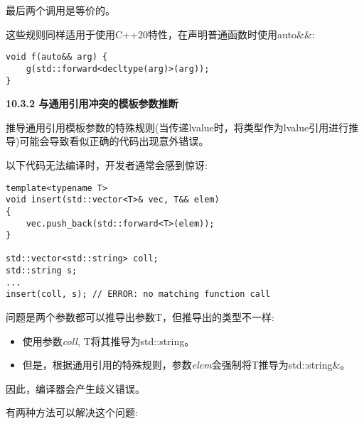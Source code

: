 最后两个调用是等价的。\par

这些规则同样适用于使用C++20特性，在声明普通函数时使用auto\&\&:\par

\begin{lstlisting}[caption={}]
void f(auto&& arg) {
	g(std::forward<decltype(arg)>(arg));
}
\end{lstlisting}

\hspace*{\fill} \par %
\textbf{10.3.2 与通用引用冲突的模板参数推断}

推导通用引用模板参数的特殊规则(当传递lvalue时，将类型作为lvalue引用进行推导)可能会导致看似正确的代码出现意外错误。\par

以下代码无法编译时，开发者通常会感到惊讶:\par

\begin{lstlisting}[caption={}]
template<typename T>
void insert(std::vector<T>& vec, T&& elem)
{
	vec.push_back(std::forward<T>(elem));
}

std::vector<std::string> coll;
std::string s;
...
insert(coll, s); // ERROR: no matching function call
\end{lstlisting}

问题是两个参数都可以推导出参数T，但推导出的类型不一样:\par

\begin{itemize}
	\item 使用参数\textit{coll}, T将其推导为std::string。
	\item 但是，根据通用引用的特殊规则，参数\textit{elem}会强制将T推导为std::string\&。
\end{itemize}

因此，编译器会产生歧义错误。\par

有两种方法可以解决这个问题:\par

